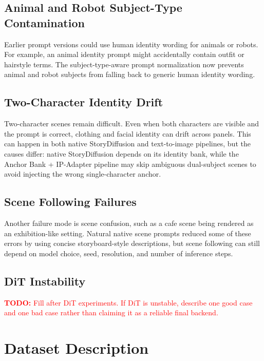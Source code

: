 \documentclass[11pt,a4paper]{article}
\newcommand{\todo}[1]{\textcolor{red}{\textbf{TODO:} #1}}
\begin{document}
\subsection{Animal and Robot Subject-Type Contamination}

Earlier prompt versions could use human identity wording for animals or robots. For example, an animal identity prompt might accidentally contain outfit or hairstyle terms. The subject-type-aware prompt normalization now prevents animal and robot subjects from falling back to generic human identity wording.

\subsection{Two-Character Identity Drift}

Two-character scenes remain difficult. Even when both characters are visible and the prompt is correct, clothing and facial identity can drift across panels. This can happen in both native StoryDiffusion and text-to-image pipelines, but the causes differ: native StoryDiffusion depends on its identity bank, while the Anchor Bank + IP-Adapter pipeline may skip ambiguous dual-subject scenes to avoid injecting the wrong single-character anchor.

\subsection{Scene Following Failures}

Another failure mode is scene confusion, such as a cafe scene being rendered as an exhibition-like setting. Natural native scene prompts reduced some of these errors by using concise storyboard-style descriptions, but scene following can still depend on model choice, seed, resolution, and number of inference steps.

\subsection{DiT Instability}

\todo{Fill after DiT experiments. If DiT is unstable, describe one good case and one bad case rather than claiming it as a reliable final backend.}

\section{Dataset Description}
\label{sec:dataset}
\end{document}
